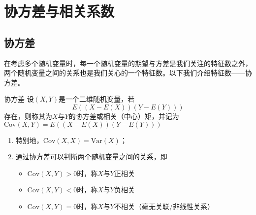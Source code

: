 \section{协方差与相关系数}
\subsection{协方差}
在考虑多个随机变量时，每一个随机变量的期望与方差是我们关注的特征数之外，两个随机变量之间的关系也是我们关心的一个特征数。以下我们介绍特征数——协方差。

\begin{definition}{协方差}\label{def:covariance}
设$(X,Y)$是一个二维随机变量，若$$E\left( (X-E(X))(Y-E(Y)) \right) $$存在，则称其为$X$与$Y$的协方差或相关（中心）矩，并记为$\text{Cov}(X,Y)=E\left ( (X-E(X))(Y-E(Y)) \right)$
\end{definition}
\begin{remark}
    \begin{enumerate}
        \item 特别地，$\text{Cov}(X,X)=\text{Var}(X)$；
        \item 通过协方差可以判断两个随机变量之间的关系，即
        \begin{itemize}
    \item $\text{Cov}(X,Y)>0$时，称$X$与$Y$正相关
    \item $\text{Cov}(X,Y)<0$时，称$X$与$Y$负相关
    \item $\text{Cov}(X,Y)=0$时，称$X$与$Y$不相关（毫无关联/非线性关系）
\end{itemize}
    \end{enumerate}
\end{remark}

